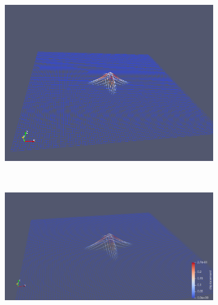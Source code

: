 \begin{figure}[H]
\begin{subfigure}[t]{0.5\textwidth}
        \includegraphics[width=\textwidth]{img/fiber/density_1_radius_1_amplitude_0.1/5.png}
    \end{subfigure}%
    ~
    \begin{subfigure}[t]{0.5\textwidth}
        \centering
        \includegraphics[width=\textwidth]{img/fiber/density_1_radius_1_amplitude_0.1/6.png}
    \end{subfigure}
\end{figure}

